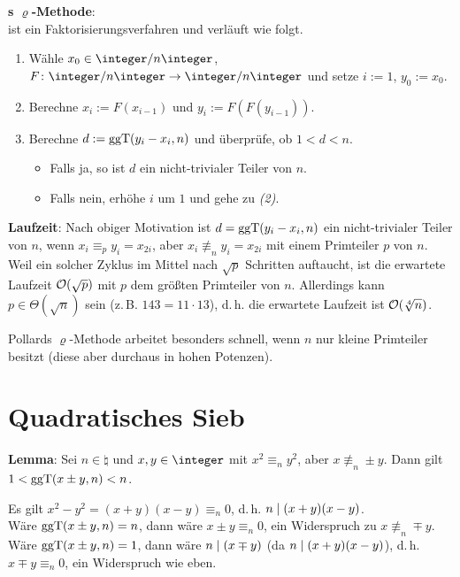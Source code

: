 \linie

\textbf{s $\varrho$-Methode}:\\
 ist ein Faktorisierungsverfahren und verläuft wie
folgt.
\begin{enumerate}
    \item
    Wähle $x_0 \in \ZnZ$, $F\colon \ZnZ \rightarrow \ZnZ$
    und setze $i := 1$, $y_0 := x_0$.

    \item
    Berechne $x_i := F(x_{i-1})$ und $y_i := F(F(y_{i-1}))$.

    \item
    Berechne $d := \operatorname{ggT}(y_i - x_i, n)$ und überprüfe, ob $1 < d < n$.
    \begin{itemize}
        \item
        Falls ja, so ist $d$ ein nicht-trivialer Teiler von $n$.

        \item
        Falls nein, erhöhe $i$ um $1$ und gehe zu \emph{(2)}.
    \end{itemize}
\end{enumerate}

\linie

\textbf{Laufzeit}:
Nach obiger Motivation ist $d = \operatorname{ggT}(y_i - x_i, n)$ ein nicht-trivialer Teiler von $n$, wenn
$x_i \equiv_p y_i = x_{2i}$, aber $x_i \not\equiv_n y_i = x_{2i}$ mit einem Primteiler $p$ von $n$.
Weil ein solcher Zyklus im Mittel nach $\sqrt{p}$ Schritten auftaucht,
ist die erwartete Laufzeit $\mathcal{O}(\sqrt{p})$ mit $p$ dem größten Primteiler von $n$.
Allerdings kann $p \in \Theta(\sqrt{n})$ sein (z.\,B. $143 = 11 \cdot 13$), d.\,h.
die erwartete Laufzeit ist $\mathcal{O}(\sqrt[4]{n})$.

Pollards $\varrho$-Methode arbeitet besonders schnell, wenn $n$ nur kleine Primteiler besitzt
(diese aber durchaus in hohen Potenzen).

\pagebreak

\section{%
    Quadratisches Sieb%
}

\textbf{Lemma}:
Sei $n \in \natural$ und $x, y \in \integer$ mit $x^2 \equiv_n y^2$, aber $x \not\equiv_n \pm y$.
Dann gilt $1 < \operatorname{ggT}(x \pm y, n) < n$.

\begin{Beweis}
    Es gilt $x^2 - y^2 = (x + y)(x - y) \equiv_n 0$, d.\,h. $n \mid (x + y)(x - y)$.\\
    Wäre $\operatorname{ggT}(x \pm y, n) = n$, dann wäre $x \pm y \equiv_n 0$,
    ein Widerspruch zu $x \not\equiv_n \mp y$.\\
    Wäre $\operatorname{ggT}(x \pm y, n) = 1$, dann wäre $n \mid (x \mp y)$
    (da $n \mid (x + y)(x - y)$), d.\,h. $x \mp y \equiv_n 0$,
    ein Widerspruch wie eben.
\end{Beweis}

